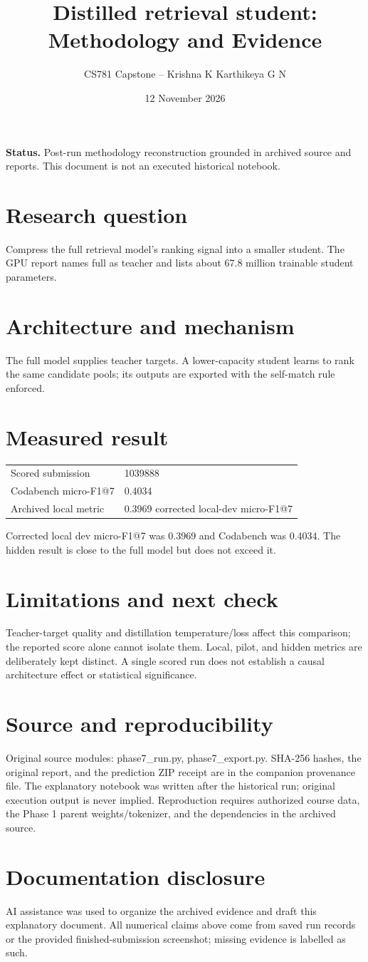 \documentclass[11pt,a4paper]{article}
\title{Distilled retrieval student: Methodology and Evidence}
\author{CS781 Capstone -- Krishna K Karthikeya G N}
\date{12 November 2026}
\begin{document}
\maketitle
\noindent\textbf{Status.} Post-run methodology reconstruction grounded in archived source and reports. This document is not an executed historical notebook.\par
\section*{Research question}
Compress the full retrieval model's ranking signal into a smaller student. The GPU report names full as teacher and lists about 67.8 million trainable student parameters.
\section*{Architecture and mechanism}
The full model supplies teacher targets. A lower-capacity student learns to rank the same candidate pools; its outputs are exported with the self-match rule enforced.
\section*{Measured result}
\begin{center}\begin{tabular}{ll}Scored submission & 1039888\\
Codabench micro-F1@7 & 0.4034\\
Archived local metric & 0.3969 corrected local-dev micro-F1@7\end{tabular}\end{center}
Corrected local dev micro-F1@7 was 0.3969 and Codabench was 0.4034. The hidden result is close to the full model but does not exceed it.
\section*{Limitations and next check}
Teacher-target quality and distillation temperature/loss affect this comparison; the reported score alone cannot isolate them. Local, pilot, and hidden metrics are deliberately kept distinct. A single scored run does not establish a causal architecture effect or statistical significance.
\section*{Source and reproducibility}
Original source modules: phase7\_run.py, phase7\_export.py. SHA-256 hashes, the original report, and the prediction ZIP receipt are in the companion provenance file. The explanatory notebook was written after the historical run; original execution output is never implied. Reproduction requires authorized course data, the Phase 1 parent weights/tokenizer, and the dependencies in the archived source.
\section*{Documentation disclosure}
AI assistance was used to organize the archived evidence and draft this explanatory document. All numerical claims above come from saved run records or the provided finished-submission screenshot; missing evidence is labelled as such.
\end{document}
